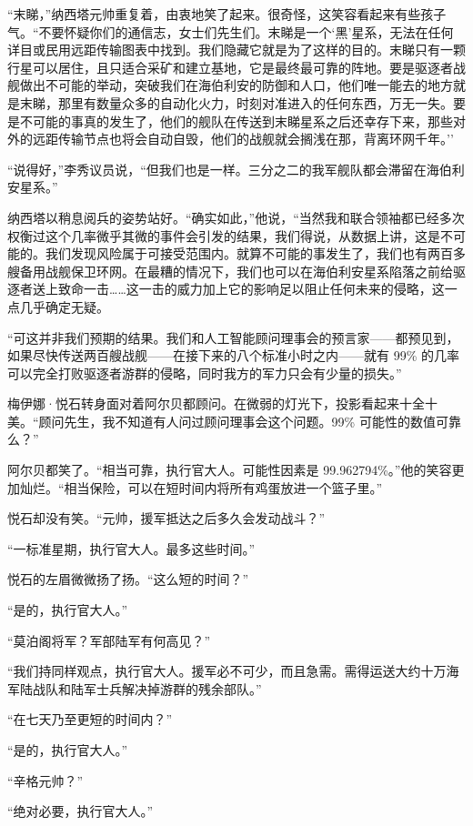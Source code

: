 \documentclass[AutoFakeBold=true]{book}
\begin{document}
``末睇，''纳西塔元帅重复着，由衷地笑了起来。很奇怪，这笑容看起来有些孩子气。``不要怀疑你们的通信志，女士们先生们。末睇是一个`黑'星系，无法在任何详目或民用远距传输图表中找到。我们隐藏它就是为了这样的目的。末睇只有一颗行星可以居住，且只适合采矿和建立基地，它是最终最可靠的阵地。要是驱逐者战舰做出不可能的举动，突破我们在海伯利安的防御和人口，他们唯一能去的地方就是末睇，那里有数量众多的自动化火力，时刻对准进入的任何东西，万无一失。要是不可能的事真的发生了，他们的舰队在传送到末睇星系之后还幸存下来，那些对外的远距传输节点也将会自动自毁，他们的战舰就会搁浅在那，背离环网千年。''

``说得好，''李秀议员说，``但我们也是一样。三分之二的我军舰队都会滞留在海伯利安星系。''

纳西塔以稍息阅兵的姿势站好。``确实如此，''他说，``当然我和联合领袖都已经多次权衡过这个几率微乎其微的事件会引发的结果，我们得说，从数据上讲，这是不可能的。我们发现风险属于可接受范围内。就算不可能的事发生了，我们也有两百多艘备用战舰保卫环网。在最糟的情况下，我们也可以在海伯利安星系陷落之前给驱逐者送上致命一击……这一击的威力加上它的影响足以阻止任何未来的侵略，这一点几乎确定无疑。

``{\kaishu 可这并非我们预期的结果}。我们和人工智能顾问理事会的预言家——都预见到，如果尽快传送两百艘战舰——在接下来的八个标准小时之内——就有 99\% 的几率可以完全打败驱逐者游群的侵略，同时我方的军力只会有少量的损失。''

梅伊娜·悦石转身面对着阿尔贝都顾问。在微弱的灯光下，投影看起来十全十美。``顾问先生，我不知道有人问过顾问理事会这个问题。99\% 可能性的数值可靠么？''

阿尔贝都笑了。``相当可靠，执行官大人。可能性因素是 99.962794\%。''他的笑容更加灿烂。``相当保险，可以在短时间内将所有鸡蛋放进一个篮子里。''

悦石却没有笑。``元帅，援军抵达之后多久会发动战斗？''

``一标准星期，执行官大人。最多这些时间。''

悦石的左眉微微扬了扬。``这么短的时间？''

``是的，执行官大人。''

``莫泊阁将军？军部陆军有何高见？''

``我们持同样观点，执行官大人。援军必不可少，而且急需。需得运送大约十万海军陆战队和陆军士兵解决掉游群的残余部队。''

``在七天乃至更短的时间内？''

``是的，执行官大人。''

``辛格元帅？''

``绝对必要，执行官大人。''
\end{document}
